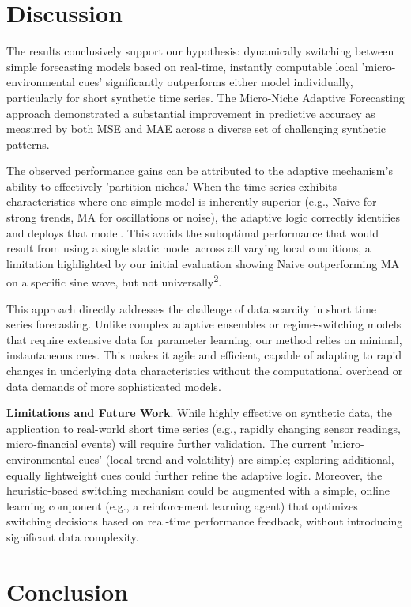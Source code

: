 \documentclass[11pt,letterpaper]{article}
\begin{document}
\section{Discussion}

The results conclusively support our hypothesis: dynamically switching between simple forecasting models based on real-time, instantly computable local 'micro-environmental cues' significantly outperforms either model individually, particularly for short synthetic time series. The Micro-Niche Adaptive Forecasting approach demonstrated a substantial improvement in predictive accuracy as measured by both MSE and MAE across a diverse set of challenging synthetic patterns.

The observed performance gains can be attributed to the adaptive mechanism's ability to effectively 'partition niches.' When the time series exhibits characteristics where one simple model is inherently superior (e.g., Naive for strong trends, MA for oscillations or noise), the adaptive logic correctly identifies and deploys that model. This avoids the suboptimal performance that would result from using a single static model across all varying local conditions, a limitation highlighted by our initial evaluation showing Naive outperforming MA on a specific sine wave, but not universally\textsuperscript{2}.

This approach directly addresses the challenge of data scarcity in short time series forecasting. Unlike complex adaptive ensembles or regime-switching models that require extensive data for parameter learning, our method relies on minimal, instantaneous cues. This makes it agile and efficient, capable of adapting to rapid changes in underlying data characteristics without the computational overhead or data demands of more sophisticated models.

\textbf{Limitations and Future Work}. While highly effective on synthetic data, the application to real-world short time series (e.g., rapidly changing sensor readings, micro-financial events) will require further validation. The current 'micro-environmental cues' (local trend and volatility) are simple; exploring additional, equally lightweight cues could further refine the adaptive logic. Moreover, the heuristic-based switching mechanism could be augmented with a simple, online learning component (e.g., a reinforcement learning agent) that optimizes switching decisions based on real-time performance feedback, without introducing significant data complexity.

\section{Conclusion}
\end{document}
